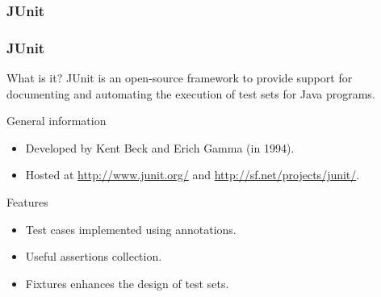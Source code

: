 \begin{frame}[c, parent={cmap:software-testing}, hasprev=false, hasnext=false]
\frametitle{JUnit}
\label{cmap:junit}

\end{frame}


\begin{frame}[parent={cmap:junit}, hasprev=false, hasnext=true]
\frametitle{JUnit}
\label{concept:junit}

\begin{block:concept}{What is it?}
JUnit is an open-source framework to provide support for documenting and
automating the execution of test sets for Java programs.
\end{block:concept}


\begin{block:fact}{General information}
\begin{itemize}
	\item Developed by Kent Beck and Erich Gamma (in 1994).

	\item Hosted at \url{http://www.junit.org/} and
	\url{http://sf.net/projects/junit/}.
\end{itemize}
\end{block:fact}


\begin{block:fact}{Features}
\begin{itemize}
	\item Test cases implemented using annotations.

	\item Useful assertions collection.

	\item Fixtures enhances the design of test sets.
\end{itemize}
\end{block:fact}

\hfill
{}
\end{frame}



